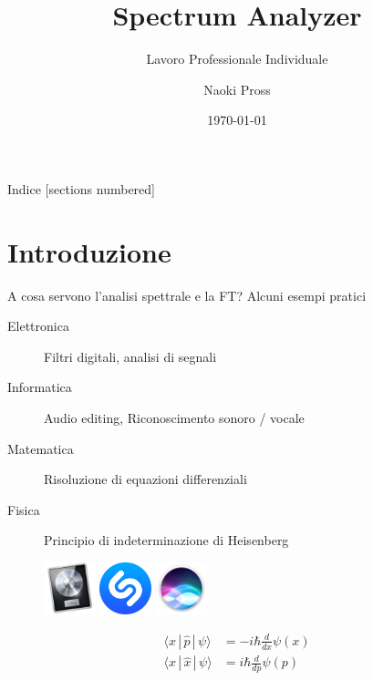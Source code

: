 \documentclass[10pt, xetex]{beamer}
\title{Spectrum Analyzer}
\subtitle{Lavoro Professionale Individuale}
\date{\today}
\author{Naoki Pross}
\institute{SAM Bellinzona}
\begin{document}
\maketitle

\begin{frame}{Indice}
    [sections numbered]
    \tableofcontents[hideallsubsections]
\end{frame}

\section{Introduzione}
\begin{frame}{A cosa servono l'analisi spettrale e la FT?}
    \vfill
    Alcuni esempi pratici
    \begin{description}
        \item [Elettronica] Filtri digitali, analisi di segnali
        \item [Informatica] Audio editing, Riconoscimento sonoro / vocale
        \item [Matematica] Risoluzione di equazioni differenziali
        \item [Fisica] Principio di indeterminazione di Heisenberg
    \end{description}
    \vfill
    \begin{figure} \centering
        \includegraphics[height=1.5cm]{figures/logo/logic}
        \hfill
        \includegraphics[height=1.5cm]{figures/logo/shazam}
        \hfill
        \includegraphics[height=1.5cm]{figures/logo/siri}
        \hfill
        \begin{minipage}[b][1.5cm][c]{.25\linewidth}
        \begin{align*}
            \langle x\,|\,\hat p\,|\,\psi \rangle &= 
                -i\mathbf{\hbar}\frac{d}{dx} \psi(x) \\
            \langle x\,|\,\hat x\,|\,\psi \rangle &= 
                i\mathbf{\hbar}\frac{d}{dp} \psi(p) \\
        \end{align*}
        \end{minipage}
    \end{figure}
\end{frame}
\end{document}
